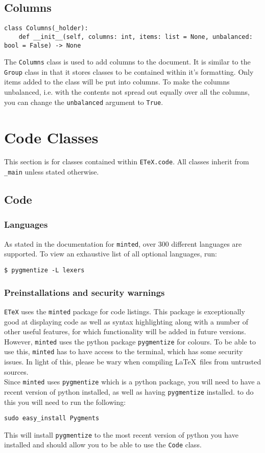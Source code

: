\documentclass{article}
\begin{document}
\subsection{Columns}\label{subsec:columns}
\begin{verbatim}
class Columns(_holder):
	def __init__(self, columns: int, items: list = None, unbalanced: bool = False) -> None
\end{verbatim}
The \verb|Columns| class is used to add columns to the document. It is similar to the \verb|Group| class in that it stores classes to be contained within it's formatting. Only items added to the class will be put into columns. To make the columns unbalanced, i.e. with the contents not spread out equally over all the columns, you can change the \verb|unbalanced| argument to \verb|True|.
\section{Code Classes}\label{sec:code_classes}
This section is for classes contained within \verb|ETeX.code|. All classes inherit from \verb|_main| unless stated otherwise.
\subsection{Code}\label{subsec:code}

\subsubsection{Languages}\label{subsubsec:languages}
As stated in the documentation for \verb|minted|, over 300 different languages are supported. To view an exhaustive list of all optional languages, run:\begin{verbatim}
$ pygmentize -L lexers
\end{verbatim}

\subsubsection{Preinstallations and security warnings}\label{subsubsec:preinstallations_and_security_warnings}
\verb|ETeX| uses the \verb|minted| package for code listings. This package is exceptionally good at displaying code as well as syntax highlighting along with a number of other useful features, for which functionality will be added in future versions. However, \verb|minted| uses the python package \verb|pygmentize| for colours. To be able to use this, \verb|minted| has to have access to the terminal, which has some security issues. In light of this, please be wary when compiling \LaTeX\ files from untrusted sources.\\
Since \verb|minted| uses \verb|pygmentize| which is a python package, you will need to have a recent version of python installed, as well as having \verb|pygmentize| installed. to do this you will need to run the following:\begin{verbatim}
sudo easy_install Pygments
\end{verbatim}
This will install \verb|pygmentize| to the most recent version of python you have installed and should allow you to be able to use the \verb|Code| class.
\end{document}
